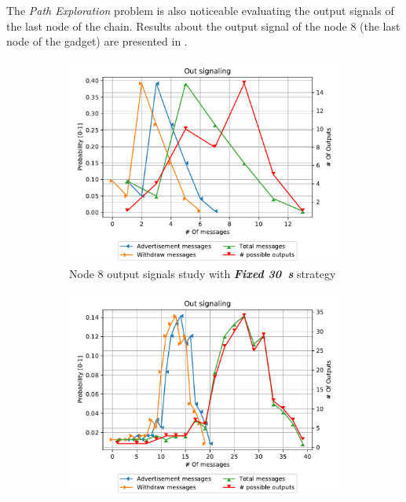 The \textit{Path Exploration} problem is also noticeable evaluating the
output signals of the last node of the chain.
Results about the output signal of the node \num{8} (the last node of the gadget)
are presented in .

\begin{figure}[ht]
     \centering
     \begin{subfigure}[b]{0.32\textwidth}
         \centering
         \includegraphics[width=\textwidth]{images/signal_study/fabrikant/30Fixed.pdf}
		 \caption{Node \num{8} output signals study with \textbf{\textit{Fixed \SI{30}{\second}}} strategy}
         \label{fig:signal_node9_fabrikant_fixed30_noIW}
     \end{subfigure}
     \hfill
     \begin{subfigure}[b]{0.32\textwidth}
         \centering
         \includegraphics[width=\textwidth]{images/signal_study/fabrikant/Descendent.pdf}

\end{subfigure}
\end{figure}
